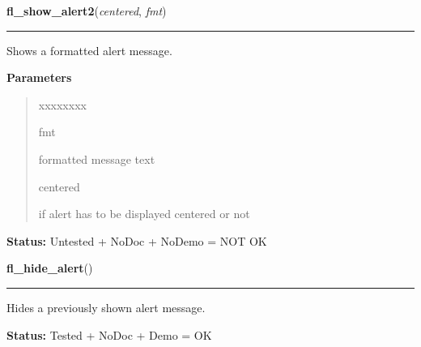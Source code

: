     \label{xformslib:library:fl_show_alert2}

    \vspace{0.5ex}

\hspace{.8\funcindent}\begin{boxedminipage}{\funcwidth}

    \raggedright \textbf{fl\_show\_alert2}(\textit{centered}, \textit{fmt})

    \vspace{-1.5ex}

    \rule{\textwidth}{0.5\fboxrule}
\setlength{\parskip}{2ex}
    Shows a formatted alert message.

\setlength{\parskip}{1ex}
      \textbf{Parameters}
      \vspace{-1ex}

      \begin{quote}
        \begin{Ventry}{xxxxxxxx}

          \item[fmt]

          formatted message text

          \item[centered]

          if alert has to be displayed centered or not

        \end{Ventry}

      \end{quote}

\textbf{Status:} Untested + NoDoc + NoDemo = NOT OK



    \end{boxedminipage}

    \label{xformslib:library:fl_hide_alert}

    \vspace{0.5ex}

\hspace{.8\funcindent}\begin{boxedminipage}{\funcwidth}

    \raggedright \textbf{fl\_hide\_alert}()

    \vspace{-1.5ex}

    \rule{\textwidth}{0.5\fboxrule}
\setlength{\parskip}{2ex}
    Hides a previously shown alert message.

\setlength{\parskip}{1ex}
\textbf{Status:} Tested + NoDoc + Demo = OK



    \end{boxedminipage}

